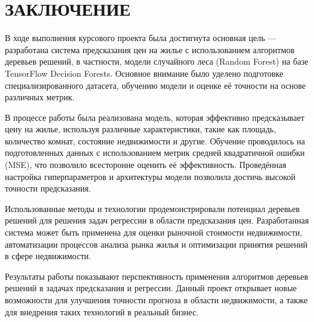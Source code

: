 {\section{\MakeUppercase{Заключение}}
В ходе выполнения курсового проекта была достигнута основная цель — разработана система предсказания цен на жилье с использованием алгоритмов деревьев решений, в частности, модели случайного леса (Random Forest) на базе TensorFlow Decision Forests. Основное внимание было уделено подготовке специализированного датасета, обучению модели и оценке её точности на основе различных метрик.

В процессе работы была реализована модель, которая эффективно предсказывает цену на жилье, используя различные характеристики, такие как площадь, количество комнат, состояние недвижимости и другие. Обучение проводилось на подготовленных данных с использованием метрик средней квадратичной ошибки (MSE), что позволило всесторонне оценить её эффективность. Проведённая настройка гиперпараметров и архитектуры модели позволила достичь высокой точности предсказания.

Использованные методы и технологии продемонстрировали потенциал деревьев решений для решения задач регрессии в области предсказания цен. Разработанная система может быть применена для оценки рыночной стоимости недвижимости, автоматизации процессов анализа рынка жилья и оптимизации принятия решений в сфере недвижимости.

Результаты работы показывают перспективность применения алгоритмов деревьев решений в задачах предсказания и регрессии. Данный проект открывает новые возможности для улучшения точности прогноза в области недвижимости, а также для внедрения таких технологий в реальный бизнес.
\newpage
}
